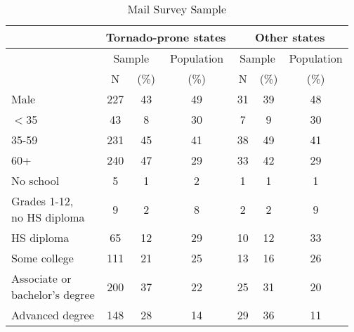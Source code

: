 
\begin{table}[!htbp]
 \caption{Mail Survey Sample}
\label{descr_mail}
\footnotesize
\centering
\begin{tabular}{lcccccc}
\hline 
\hline
 & \multicolumn{3}{c}{\textbf{Tornado-prone states}} & \multicolumn{3}{c}{\textbf{Other states}}\\

\hline 
 & \multicolumn{2}{c}{Sample} & Population & \multicolumn{2}{c}{Sample} & Population\\

  \hline
 & N & (\%) & (\%) & N & (\%) & (\%) \\ 
  \hline

Male & 227 & 43 & 49 & 31 & 39 & 48 \\ 
  $<$35 & 43 & 8 & 30 & 7 & 9 & 30 \\ 
  35-59 & 231 & 45 & 41 & 38 & 49 & 41 \\ 
  60+ & 240 & 47 & 29 & 33 & 42 & 29 \\ 
  No school & 5 & 1 & 2 & 1 & 1 & 1 \\ 
   \makecell[l]{Grades 1-12,\\ no HS diploma}& 9 & 2 & 8 & 2 & 2 & 9 \\ 
  HS diploma & 65 & 12 & 29 & 10 & 12 & 33 \\ 
  Some college & 111 & 21 & 25 & 13 & 16 & 26 \\ 
  \makecell[l]{Associate or\\ bachelor's degree} & 200 & 37 & 22 & 25 & 31 & 20 \\ 
  Advanced degree & 148 & 28 & 14 & 29 & 36 & 11 \\ 
\hline
\end{tabular}
\end{table}